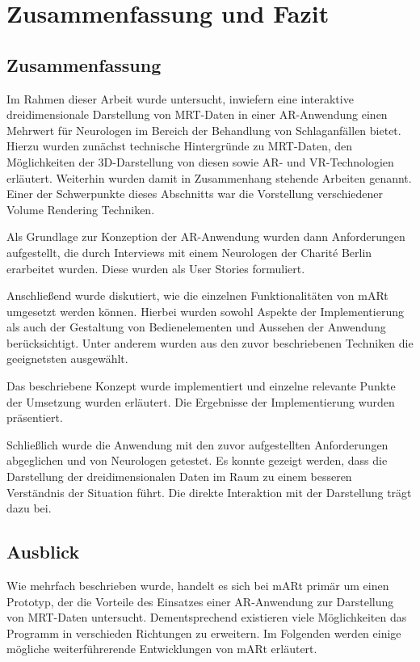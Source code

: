 
\chapter{Zusammenfassung und Fazit}
\label{fazit}

\section{Zusammenfassung}

Im Rahmen dieser Arbeit wurde untersucht, inwiefern eine interaktive dreidimensionale Darstellung von MRT-Daten in einer AR-Anwendung einen Mehrwert für Neurologen im Bereich der Behandlung von Schlaganfällen bietet. 
Hierzu wurden zunächst technische Hintergründe zu MRT-Daten, den Möglichkeiten der 3D-Darstellung von diesen sowie AR- und VR-Technologien erläutert. Weiterhin wurden damit in Zusammenhang stehende Arbeiten genannt. Einer der Schwerpunkte dieses Abschnitts war die Vorstellung verschiedener Volume Rendering Techniken.

Als Grundlage zur Konzeption der AR-Anwendung wurden dann Anforderungen aufgestellt, die durch Interviews mit einem Neurologen der Charité Berlin erarbeitet wurden. Diese wurden als User Stories formuliert.

Anschließend wurde diskutiert, wie die einzelnen Funktionalitäten von mARt umgesetzt werden können. Hierbei wurden sowohl Aspekte der Implementierung als auch der Gestaltung von Bedienelementen und Aussehen der Anwendung berücksichtigt. Unter anderem wurden aus den zuvor beschriebenen Techniken die geeignetsten ausgewählt. 

Das beschriebene Konzept wurde implementiert und einzelne relevante Punkte der Umsetzung wurden erläutert. Die Ergebnisse der Implementierung wurden präsentiert.

Schließlich wurde die Anwendung mit den zuvor aufgestellten Anforderungen abgeglichen und von Neurologen getestet. 
Es konnte gezeigt werden, dass die Darstellung der dreidimensionalen Daten im Raum zu einem besseren Verständnis der Situation führt. Die direkte Interaktion mit der Darstellung trägt dazu bei. 

\section{Ausblick}

Wie mehrfach beschrieben wurde, handelt es sich bei mARt primär um einen Prototyp, der die Vorteile des Einsatzes einer AR-Anwendung zur Darstellung von MRT-Daten untersucht. Dementsprechend existieren viele Möglichkeiten das Programm in verschieden Richtungen zu erweitern.
Im Folgenden werden einige mögliche weiterführerende Entwicklungen von mARt erläutert.


